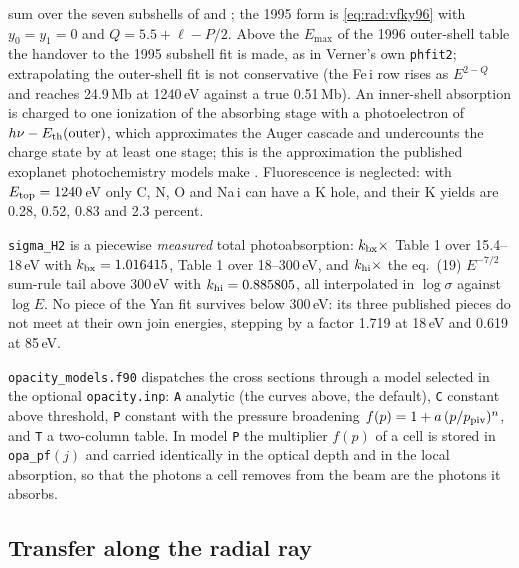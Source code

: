 \begin{description}
{  sum} over the seven subshells of \citet{Verner1996} and
  \citet{Verner1995}; the
  1995 form is \eqref{eq:rad:vfky96} with $y_0=y_1=0$ and
  $Q = 5.5+\ell-P/2$. Above the $E_{\max}$ of the 1996 outer-shell table the
  handover to the 1995 subshell fit is made, as in Verner's own
  \texttt{phfit2}; extrapolating the outer-shell fit is not conservative
  (the Fe\,{\sc i} row rises as $E^{2-Q}$ and reaches 24.9\,Mb at 1240\,eV
  against a true 0.51\,Mb). An inner-shell absorption is charged to one
  ionization of the absorbing stage with a photoelectron of
  $h\nu - E_{\rm th}({\rm outer})$, which approximates the Auger cascade and
  undercounts the charge state by at least one stage; this is the
  approximation the published exoplanet photochemistry models make
  \citep{Cecchi2009, Locci2022}. Fluorescence is neglected: with $E_{\rm top}=1240$\,eV only
  C, N, O and Na\,{\sc i} can have a K hole, and their K yields \citep{Krause1979} are 0.28, 0.52, 0.83 and 2.3
  percent.
\item[H$_2$] \texttt{sigma\_H2} is a piecewise \emph{measured} total
  photoabsorption: $k_{\rm bx}\times$ \citet{Backx1976} Table 1 over
  15.4--18\,eV with $k_{\rm bx}=1.016415$, \citet{Samson1994} Table 1
  over 18--300\,eV, and $k_{\rm hi}\times$ the \citet{Yan1998} eq.~(19) $E^{-7/2}$ sum-rule tail above 300\,eV with
  $k_{\rm hi}=0.885805$, all interpolated in $\log\sigma$ against $\log E$.
  No piece of the Yan fit survives below 300\,eV: its three published pieces
  do not meet at their own join energies, stepping by a factor 1.719 at
  18\,eV and 0.619 at 85\,eV.
\item[Opacity models] \texttt{opacity\_models.f90} dispatches the cross
  sections through a model selected in the optional \texttt{opacity.inp}:
  \texttt{A} analytic (the curves above, the default), \texttt{C} constant
  above threshold, \texttt{P} constant with the \citet{Robinson2012}
  pressure broadening $f(p) = 1 + a\,(p/p_{\rm piv})^{n}$, and \texttt{T} a
  two-column table. In model \texttt{P} the multiplier $f(p)$ of a cell is
  stored in \texttt{opa\_pf}$(j)$ and carried identically in the optical
  depth and in the local absorption, so that the photons a cell removes from
  the beam are the photons it absorbs.
\end{description}

\subsection{Transfer along the radial ray}
\label{sec:radiation:transfer}

